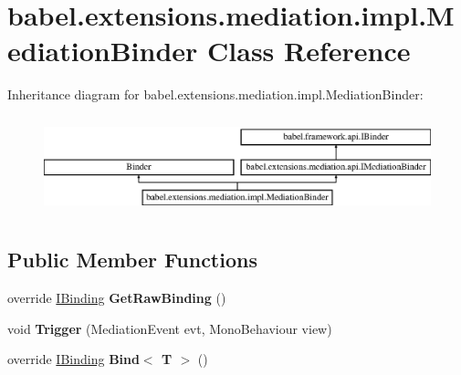 \hypertarget{classbabel_1_1extensions_1_1mediation_1_1impl_1_1_mediation_binder}{\section{babel.\-extensions.\-mediation.\-impl.\-Mediation\-Binder Class Reference}
\label{classbabel_1_1extensions_1_1mediation_1_1impl_1_1_mediation_binder}
}
Inheritance diagram for babel.\-extensions.\-mediation.\-impl.\-Mediation\-Binder\-:\begin{figure}[H]
\begin{center}
\leavevmode
\includegraphics[height=2.866894cm]{classbabel_1_1extensions_1_1mediation_1_1impl_1_1_mediation_binder}
\end{center}
\end{figure}
\subsection*{Public Member Functions}
\begin{DoxyCompactItemize}
\item 
\hypertarget{classbabel_1_1extensions_1_1mediation_1_1impl_1_1_mediation_binder_ab6496a2f3e7e36a10dbb9125a2d0f14e}{override \hyperlink{interfacebabel_1_1framework_1_1api_1_1_i_binding}{I\-Binding} {\bfseries Get\-Raw\-Binding} ()}\label{classbabel_1_1extensions_1_1mediation_1_1impl_1_1_mediation_binder_ab6496a2f3e7e36a10dbb9125a2d0f14e}

\item 
\hypertarget{classbabel_1_1extensions_1_1mediation_1_1impl_1_1_mediation_binder_a022c8da7b33d22b2fdc3a39354a15b26}{void {\bfseries Trigger} (Mediation\-Event evt, Mono\-Behaviour view)}\label{classbabel_1_1extensions_1_1mediation_1_1impl_1_1_mediation_binder_a022c8da7b33d22b2fdc3a39354a15b26}

\item 
\hypertarget{classbabel_1_1extensions_1_1mediation_1_1impl_1_1_mediation_binder_a23be7f344c7ab79a42fa77296048c071}{override \hyperlink{interfacebabel_1_1framework_1_1api_1_1_i_binding}{I\-Binding} {\bfseries Bind$<$ T $>$} ()}\label{classbabel_1_1extensions_1_1mediation_1_1impl_1_1_mediation_binder_a23be7f344c7ab79a42fa77296048c071}

\end{DoxyCompactItemize}
